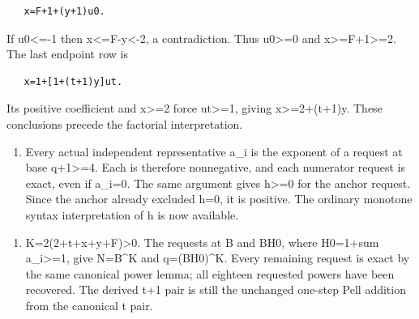 \begin{verbatim}
   x=F+1+(y+1)u0.
\end{verbatim}

If u0\textless{}\allowbreak{}=\allowbreak{}-1 then x\textless{}\allowbreak{}=\allowbreak{}F-y\textless{}\allowbreak{}-2, a contradiction. Thus u0\textgreater{}\allowbreak{}=\allowbreak{}0 and x\textgreater{}\allowbreak{}=\allowbreak{}F+\allowbreak{}1\textgreater{}\allowbreak{}=\allowbreak{}2. The last endpoint row is



\begin{verbatim}
   x=1+[1+(t+1)y]ut.
\end{verbatim}

Its positive coefficient and x\textgreater{}\allowbreak{}=\allowbreak{}2 force ut\textgreater{}\allowbreak{}=\allowbreak{}1, giving x\textgreater{}\allowbreak{}=\allowbreak{}2+\allowbreak{}(t+\allowbreak{}1)y. These conclusions precede the factorial interpretation.



\begin{enumerate}

\item[4.] Every actual independent representative a\_\allowbreak{}i is the exponent of a request at base q+\allowbreak{}1\textgreater{}\allowbreak{}=\allowbreak{}4. Each is therefore nonnegative, and each numerator request is exact, even if a\_\allowbreak{}i=\allowbreak{}0. The same argument gives h\textgreater{}\allowbreak{}=\allowbreak{}0 for the anchor request. Since the anchor already excluded h=\allowbreak{}0, it is positive. The ordinary monotone syntax interpretation of h is now available.

\end{enumerate}



\begin{enumerate}

\item[5.] K=\allowbreak{}2(2+\allowbreak{}t+\allowbreak{}x+\allowbreak{}y+\allowbreak{}F)\textgreater{}\allowbreak{}0. The requests at B and B\textasteriskcentered{}\allowbreak{}H0, where H0=\allowbreak{}1+\allowbreak{}sum a\_\allowbreak{}i\textgreater{}\allowbreak{}=\allowbreak{}1, give N=\allowbreak{}B\textasciicircum{}\allowbreak{}K and q=\allowbreak{}(B\textasteriskcentered{}\allowbreak{}H0)\textasciicircum{}\allowbreak{}K. Every remaining request is exact by the same canonical power lemma; all eighteen requested powers have been recovered. The derived t+\allowbreak{}1 pair is still the unchanged one-step Pell addition from the canonical t pair.

\end{enumerate}



